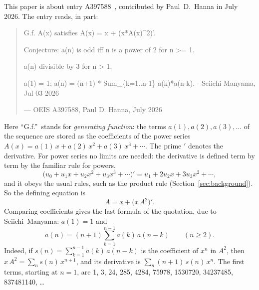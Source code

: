 \documentclass[11pt,a4paper]{article}
\theoremstyle{definition}
\theoremstyle{remark}
\begin{document}
This paper is about entry A397588~\cite{oeis}, contributed by Paul~D.~Hanna in July 2026. The entry reads, in part:
\begin{quote}\small\ttfamily\raggedright G.f. A(x) satisfies A(x) = x + (x*A(x)\^{}2)'.\par\smallskip Conjecture: a(n) is odd iff n is a power of 2 for n >= 1.\par\smallskip a(n) divisible by 3 for n > 1.\par\smallskip a(1) = 1; a(n) = (n+1) * Sum\_\{k=1..n-1\} a(k)*a(n-k). - Seiichi Manyama, Jul 03 2026\par\smallskip\hfill\textrm{--- OEIS A397588, Paul D. Hanna, July 2026}\end{quote}

Here ``G.f.''\ stands for \emph{generating function}: the terms $a(1),a(2),a(3),\dots$ of the sequence are stored as the
coefficients of the power series $A(x)=a(1)\,x+a(2)\,x^2+a(3)\,x^3+\cdots$. The prime $'$ denotes the derivative.
For power series no limits are needed: the derivative is defined term by term by the familiar rule for powers,
\[
\bigl(u_0+u_1x+u_2x^2+u_3x^3+\cdots\bigr)'=u_1+2u_2x+3u_3x^2+\cdots ,
\]
and it obeys the usual rules, such as the product rule (Section~\ref{sec:background}). So the defining equation is
\begin{equation}\label{eq:def}
A=x+\bigl(x\,A^2\bigr)' .
\end{equation}
Comparing coefficients gives the last formula of the quotation, due to Seiichi~Manyama: $a(1)=1$ and
\[
a(n)=(n+1)\sum_{k=1}^{n-1}a(k)\,a(n-k)\qquad(n\ge2).
\]
Indeed, if $s(n)=\sum_{k=1}^{n-1}a(k)\,a(n-k)$ is the coefficient of $x^n$ in $A^2$, then $x\,A^2=\sum_ns(n)\,x^{n+1}$,
and its derivative is $\sum_n(n+1)\,s(n)\,x^n$. The first terms, starting at $n=1$, are
1, 3, 24, 285, 4284, 75978, 1530720, 34237485, 837481140, \dots
\end{document}
